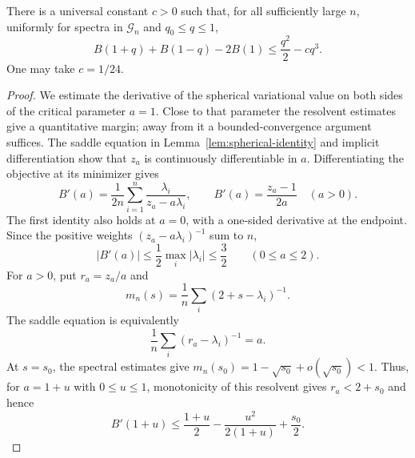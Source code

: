 \begin{lemma}
\label{lem:cubic-deficit}
There is a universal constant $c>0$ such that, for all sufficiently large $n$,
uniformly for spectra in $\mathcal G_n$ and $q_0\le q\le1$,
\begin{equation}
 B(1+q)+B(1-q)-2B(1)
 \le \frac{q^2}{2}-cq^3.
 \label{eq:cubic-deficit}
\end{equation}
One may take $c=1/24$.
\end{lemma}

\begin{proof}
We estimate the derivative of the spherical variational value on
both sides of the critical parameter $a=1$. Close to that parameter
the resolvent estimates give a quantitative margin; away from it a
bounded-convergence argument suffices. The saddle equation in
Lemma~\ref{lem:spherical-identity} and implicit differentiation show
that $z_a$ is continuously differentiable in $a$.
Differentiating the objective at its minimizer gives
\begin{equation}
 B'(a)=\frac1{2n}\sum_{i=1}^n
       \frac{\lambda_i}{z_a-a\lambda_i},
 \qquad
 B'(a)=\frac{z_a-1}{2a}\quad(a>0).
 \label{eq:orientation-saddle-derivative}
\end{equation}
The first identity also holds at $a=0$, with a one-sided derivative at the
endpoint.  Since the positive weights $(z_a-a\lambda_i)^{-1}$ sum to $n$,
\[
 |B'(a)|\le\frac12\max_i|\lambda_i|\le\frac32
 \qquad(0\le a\le2).
\]
For $a>0$, put $r_a=z_a/a$ and
\[
 m_n(s)=\frac1n\sum_i(2+s-\lambda_i)^{-1}.
\]
The saddle equation is equivalently
\[
 \frac1n\sum_i(r_a-\lambda_i)^{-1}=a.
\]
At $s=s_0$, the spectral estimates give
$m_n(s_0)=1-\sqrt{s_0}+o(\sqrt{s_0})<1$.  Thus, for $a=1+u$ with
$0\le u\le1$, monotonicity of this resolvent gives $r_a<2+s_0$ and hence
\begin{equation}
 B'(1+u)
 \le \frac{1+u}{2}-\frac{u^2}{2(1+u)}+\frac{s_0}{2}.
 \label{eq:orientation-supercritical-derivative}
\end{equation}


\end{proof}

